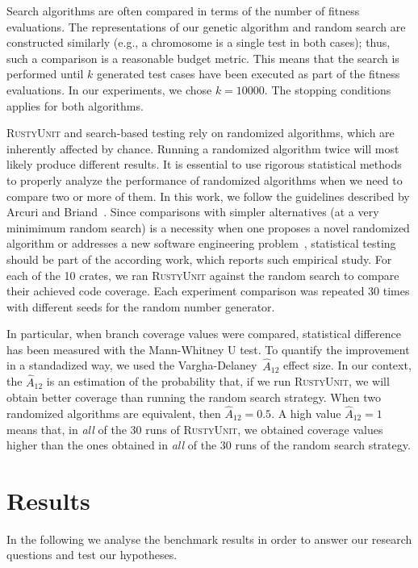 \documentclass[paper=a4,%
  twoside,%
  BCOR4mm,%
  abstract=true,%
  toc=bibliography,%
  chapterprefix=true,%
  toc=bibliographynumbered,%
  open=right,%
  english,%
  pagesize=pdftex]{scrreprt}
\newcommand{\benchnum}{10\xspace}
\newcommand{\tech}{\textsc{RustyUnit}\xspace}
\newcommand{\runs}{30\xspace}
\newcommand{\budget}{10000\xspace}
\begin{document}
Search algorithms are often compared in terms of the number of fitness evaluations. The representations of our genetic algorithm and random search are constructed similarly (e.g., a chromosome is a single test in both cases); thus, such a comparison is a reasonable budget metric. This means that the search is performed until $k$ generated test cases have been executed as part of the fitness evaluations. In our experiments, we chose $k = \budget$. The stopping conditions applies for both algorithms.

\tech and search-based testing rely on randomized algorithms, which are inherently affected by chance. Running a randomized algorithm twice will most likely produce different results. It is essential to use rigorous statistical methods to properly analyze the performance of randomized algorithms when we need to compare two or more of them. In this work, we follow the guidelines described by Arcuri and Briand~\cite{Arcuri2011}. Since comparisons with simpler alternatives (at a very minimimum random search) is a necessity when one proposes a novel randomized algorithm or addresses a new software engineering problem~\cite{Ali2010}, statistical testing should be part of the according work, which reports such empirical study. For each of the \benchnum crates, we ran \tech against the random search to compare their achieved code coverage. Each experiment comparison was repeated \runs times with different seeds for the random number generator.  %

In particular, when branch coverage values were compared, statistical difference has been measured with the Mann-Whitney U test. To quantify the improvement in a standadized way, we used the Vargha-Delaney~$\hat{A}_{12}$ effect size. In our context, the $\hat{A}_{12}$ is an estimation of the probability that, if we run \tech, we will obtain better coverage than running the random search strategy. When two randomized algorithms are equivalent, then $\hat{A}_{12} = 0.5$. A high value $\hat{A}_{12} = 1$ means that, in \emph{all} of the \runs runs of \tech, we obtained coverage values higher than the ones obtained in \emph{all} of the \runs runs of the random search strategy.


\section{Results}
\label{sec:results}
In the following we analyse the benchmark results in order to answer our research questions and test our hypotheses. 
\end{document}
